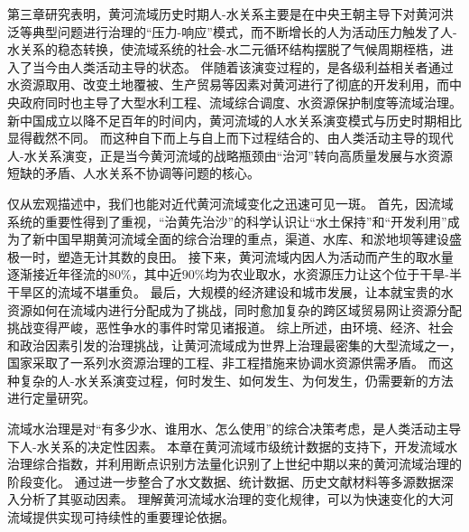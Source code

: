 第三章研究表明，黄河流域历史时期人-水关系主要是在中央王朝主导下对黄河洪泛等典型问题进行治理的“压力-响应”模式，而不断增长的人为活动压力触发了人-水关系的稳态转换，使流域系统的社会-水二元循环结构摆脱了气候周期桎梏，进入了当今由人类活动主导的状态。
伴随着该演变过程的，是各级利益相关者通过水资源取用、改变土地覆被、生产贸易等因素对黄河进行了彻底的开发利用，而中央政府同时也主导了大型水利工程、流域综合调度、水资源保护制度等流域治理。
新中国成立以降不足百年的时间内，黄河流域的人水关系演变模式与历史时期相比显得截然不同。
而这种自下而上与自上而下过程结合的、由人类活动主导的现代人-水关系演变，正是当今黄河流域的战略瓶颈由“治河”转向高质量发展与水资源短缺的矛盾、人水关系不协调等问题的核心。

仅从宏观描述中，我们也能对近代黄河流域变化之迅速可见一斑。
首先，因流域系统的重要性得到了重视，“治黄先治沙”的科学认识让“水土保持”和“开发利用”成为了新中国早期黄河流域全面的综合治理的重点，渠道、水库、和淤地坝等建设盛极一时，塑造无计其数的良田。
接下来，黄河流域内因人为活动而产生的取水量逐渐接近年径流的$80\%$，其中近$90\%$均为农业取水，水资源压力让这个位于干旱-半干旱区的流域不堪重负。
最后，大规模的经济建设和城市发展，让本就宝贵的水资源如何在流域内进行分配成为了挑战，同时愈加复杂的跨区域贸易网让资源分配挑战变得严峻，恶性争水的事件时常见诸报道。
综上所述，由环境、经济、社会和政治因素引发的治理挑战，让黄河流域成为世界上治理最密集的大型流域之一，国家采取了一系列水资源治理的工程、非工程措施来协调水资源供需矛盾。
而这种复杂的人-水关系演变过程，何时发生、如何发生、为何发生，仍需要新的方法进行定量研究。

流域水治理是对“有多少水、谁用水、怎么使用”的综合决策考虑，是人类活动主导下人-水关系的决定性因素。
本章在黄河流域市级统计数据的支持下，开发流域水治理综合指数，并利用断点识别方法量化识别了上世纪中期以来的黄河流域治理的阶段变化。
通过进一步整合了水文数据、统计数据、历史文献材料等多源数据深入分析了其驱动因素。
理解黄河流域水治理的变化规律，可以为快速变化的大河流域提供实现可持续性的重要理论依据。


